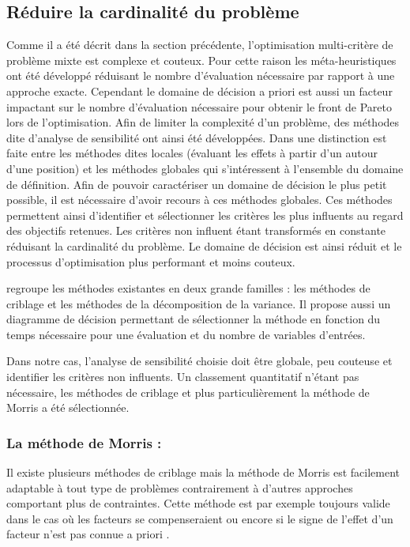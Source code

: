 \subsection{Réduire la cardinalité du problème} %
\label{sub:reduire_la_cardinalite_du_probleme}
Comme il a été décrit dans la section précédente, l’optimisation multi-critère de
problème mixte est complexe et couteux. Pour cette raison les méta-heuristiques
ont été développé réduisant le nombre d’évaluation nécessaire par rapport à une
approche exacte.
Cependant le domaine de décision a priori est aussi un facteur impactant sur le
nombre d’évaluation nécessaire pour obtenir le front de Pareto lors de l’optimisation.
Afin de limiter la complexité d’un problème, des méthodes dite d’analyse de sensibilité
ont ainsi été développées.
Dans \cite{Iooss2011} une distinction est faite entre les méthodes dites locales
(évaluant les effets à partir d’un autour d’une position) et les méthodes globales qui
s’intéressent à l’ensemble du domaine de définition. Afin de pouvoir caractériser
un domaine de décision le plus petit possible, il est nécessaire d’avoir recours à
ces méthodes globales.
Ces méthodes permettent ainsi d’identifier et sélectionner les critères les plus influents
au regard des objectifs retenues. Les critères non influent étant transformés en
constante réduisant la cardinalité du problème. Le domaine de décision est ainsi
réduit et le processus d’optimisation plus performant et moins couteux.

\cite{Iooss2011} regroupe les méthodes existantes en deux grande familles : les
méthodes de criblage et les méthodes de la décomposition de la variance. Il propose
aussi un diagramme de décision permettant de sélectionner la méthode en fonction
du temps nécessaire pour une évaluation et du nombre de variables d’entrées.

Dans notre cas, l’analyse de sensibilité choisie doit être globale, peu couteuse
et identifier les critères non influents. Un classement quantitatif n’étant pas
nécessaire, les méthodes de criblage et plus particulièrement la méthode de Morris
a été sélectionnée.

\subsubsection{La méthode de Morris :} %
\label{ssub:la_methode_de_morris}
Il existe plusieurs méthodes de criblage mais la méthode de Morris \parencite{Morris1991161}
est facilement adaptable à tout type de problèmes contrairement à d’autres approches
comportant plus de contraintes. Cette méthode est par exemple toujours valide dans le cas où
les facteurs se compenseraient ou encore si le signe de l’effet d’un facteur n’est pas
connue a priori \parencite{Saltelli2004}.


